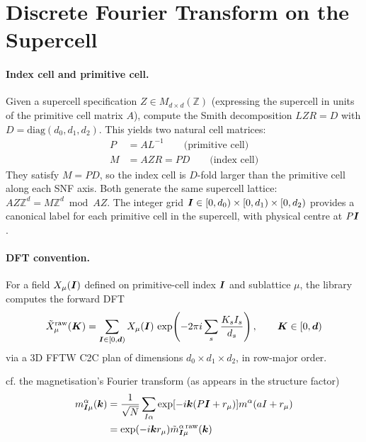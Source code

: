\documentclass[12pt,a4paper]{article}
\newcommand\bs[1]{\ensuremath\boldsymbol{#1}}
\def\raw{\mathrm{raw}}
\begin{document}
\section{Discrete Fourier Transform on the Supercell}

\paragraph{Index cell and primitive cell.}
Given a supercell specification $Z \in M_{d\times d}(\mathbb{Z})$ (expressing the supercell in units of the
primitive cell matrix $A$), compute the Smith decomposition $L Z R = D$ with $D = \mathrm{diag}(d_0, d_1, d_2)$.
This yields two natural cell matrices:
\begin{align*}
    P &= A L^{-1} \qquad \text{(primitive cell)} \\
    M &= A Z R = P D \qquad \text{(index cell)} 
\end{align*}
They satisfy $M = P D$, so the index cell is $D$-fold larger than the primitive cell along each SNF axis.
Both generate the same supercell lattice: $AZ\mathbb{Z}^d = M\mathbb{Z}^d \bmod AZ$. The integer grid
$\bs{I} \in [0,d_0)\times[0,d_1)\times[0,d_2)$ provides a canonical label for each primitive cell in the supercell,
with physical centre at $P\bs{I}$.

\paragraph{DFT convention.}
For a field $X_\mu(\bs{I})$ defined on primitive-cell index $\bs{I}$ and sublattice $\mu$, the library
computes the forward DFT
\begin{equation}
    \tilde{X}^{\raw}_\mu(\bs{K})
    = \sum_{\bs{I} \in [0,\bs{d})} X_\mu(\bs{I})\,
      \exp\!\left(-2\pi i \sum_{s} \frac{K_s I_s}{d_s}\right),
    \qquad \bs{K} \in [0,\bs{d})
    \label{eq:dft}
\end{equation}
via a 3D FFTW C2C plan of dimensions $d_0 \times d_1 \times d_2$, in row-major order.

cf. the magnetisation's Fourier transform (as appears in the structure factor)
\begin{align}  
    m^\alpha_{\bs{I} \mu}(\bs{k}) &= \frac{1}{\sqrt{N}} \sum_{I\alpha} \exp[-i \bs{k} (P\bs{I} + r_\mu) ] m^\alpha(aI + r_\mu) \nonumber\\
                          &= \exp(-i \bs{k} r_\mu) \tilde{m}^{\alpha\,\text{raw}}_{\bs{I} \mu}(\bs{k})
\end{align}
\end{document}
